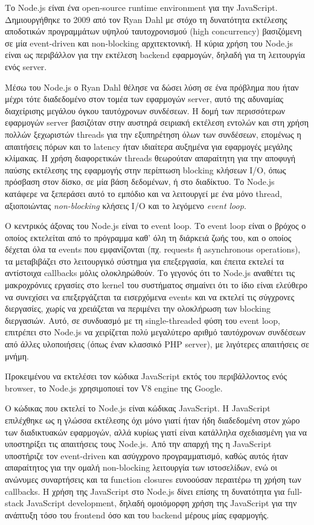 \documentclass[../thesis.tex]{subfiles}
\begin{document}
Το Node.js είναι ένα open-source runtime environment για την JavaScript.
Δημιουργήθηκε το 2009 από τον Ryan Dahl με στόχο τη δυνατότητα εκτέλεσης αποδοτικών προγραμμάτων υψηλού ταυτοχρονισμού (high concurrency) βασιζόμενη σε μία event-driven και non-blocking αρχιτεκτονική.
Η κύρια χρήση του Node.js είναι ως περιβάλλον για την εκτέλεση backend εφαρμογών, δηλαδή για τη λειτουργία ενός server.

Μέσω του Node.js ο Ryan Dahl θέλησε να δώσει λύση σε ένα πρόβλημα που ήταν μέχρι τότε διαδεδομένο στον τομέα των εφαρμογών server, αυτό της αδυναμίας διαχείρισης μεγάλου όγκου ταυτόχρονων συνδέσεων.
Η δομή των περισσότερων εφαρμογών server βασιζόταν στην αυστηρά σειριακή εκτέλεση εντολών και στη χρήση πολλών ξεχωριστών threads για την εξυπηρέτηση όλων των συνδέσεων, επομένως η απαιτήσεις πόρων και το latency ήταν ιδιαίτερα αυξημένα για εφαρμογές μεγάλης κλίμακας.
Η χρήση διαφορετικών threads θεωρούταν απαραίτητη για την αποφυγή παύσης εκτέλεσης της εφαρμογής στην περίπτωση blocking κλήσεων I/O, όπως πρόσβαση στον δίσκο, σε μία βάση δεδομένων, ή στο διαδίκτυο.
Το Node.js κατάφερε να ξεπεράσει αυτό το εμπόδιο και να λειτουργεί με ένα μόνο thread, αξιοποιώντας \textit{non-blocking} κλήσεις I/O και το λεγόμενο \textit{event loop}.

Ο κεντρικός άξονας του Node.js είναι το event loop.
Το event loop είναι ο βρόχος ο οποίος εκτελείται από το πρόγραμμα καθ' όλη τη διάρκειά ζωής του, και ο οποίος δέχεται όλα τα events που εμφανίζονται (πχ. requests ή asynchronous operations), τα μεταβιβάζει στο λειτουργικό σύστημα για επεξεργασία, και έπειτα εκτελεί τα αντίστοιχα callbacks μόλις ολοκληρώθούν.
Το γεγονός ότι το Node.js αναθέτει τις μακροχρόνιες εργασίες στο kernel του συστήματος σημαίνει ότι το ίδιο είναι ελεύθερο να συνεχίσει να επεξεργάζεται τα εισερχόμενα events και να εκτελεί τις σύγχρονες διεργασίες, χωρίς να χρειάζεται να περιμένει την ολοκλήρωση των blocking διεργασιών.
Αυτό, σε συνδυασμό με τη single-threaded φύση του event loop, επιτρέπει στο Node.js να χειρίζεται πολύ μεγαλύτερο αριθμό ταυτόχρονων συνδέσεων από άλλες υλοποιήσεις (όπως έναν κλασσικό PHP server), με λιγότερες απαιτήσεις σε μνήμη.

Προκειμένου να εκτελέσει τον κώδικα JavaScript εκτός του περιβάλλοντος ενός browser, το Node.js χρησιμοποιεί τον V8 engine της Google.

Ο κώδικας που εκτελεί το Node.js είναι κώδικας JavaScript.
Η JavaScript επιλέχθηκε ως η γλώσσα εκτέλεσης όχι μόνο γιατί ήταν ήδη διαδεδομένη στον χώρο των διαδικτυακών εφαρμογών, αλλά κυρίως γιατί είναι κατάλληλα σχεδιασμένη για να υποστηρίξει τις απαιτήσεις τους Node.js.
Από την απαρχή της η JavaScript υποστήριζε τον event-driven και ασύγχρονο προγραμματισμό, καθώς αυτός ήταν απαραίτητος για την ομαλή non-blocking λειτουργία των ιστοσελίδων, ενώ οι ανώνυμες συναρτήσεις και τα function closures ευνοούσαν περαιτέρω τη χρήση των callbacks.
Η χρήση της JavaScript στο Node.js δίνει επίσης τη δυνατότητα για full-stack JavaScript development, δηλαδή ομοιόμορφη χρήση της JavaScript για την ανάπτυξη τόσο του frontend όσο και του backend μέρους μίας εφαρμογής.
\end{document}
